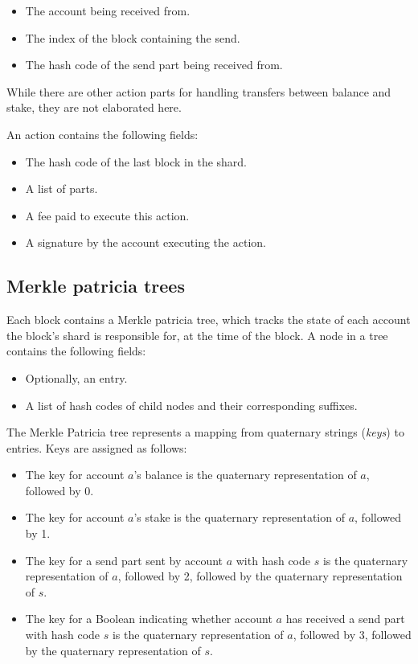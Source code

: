 \documentclass{article}
\begin{document}
\begin{itemize}
  \item The account being received from.
  \item The index of the block containing the send.
  \item The hash code of the send part being received from.
\end{itemize}

While there are other action parts for handling transfers between balance and stake, they are not elaborated here.

An action contains the following fields:

\begin{itemize}
  \item The hash code of the last block in the shard.
  \item A list of parts.
  \item A fee paid to execute this action.
  \item A signature by the account executing the action.
\end{itemize}

\subsection{Merkle patricia trees}

Each block contains a Merkle patricia tree, which tracks the state of each
account the block's shard is responsible for, at the time of the block.
A node in a tree contains the following fields:

\begin{itemize}
  \item Optionally, an entry.
  \item A list of hash codes of child nodes and their corresponding suffixes.
\end{itemize}

The Merkle Patricia tree represents a mapping from quaternary strings
(\textit{keys}) to entries.  Keys are assigned as follows:

\begin{itemize}
  \item The key for account $a$'s balance is the quaternary representation of $a$, followed by 0.
  \item The key for account $a$'s stake is the quaternary representation of $a$, followed by 1.
  \item The key for a send part sent by account $a$ with hash code $s$ is the quaternary representation of $a$, followed by 2, followed by the quaternary representation of $s$.
  \item The key for a Boolean indicating whether account $a$ has received a send part with hash code $s$ is the quaternary representation of $a$, followed by 3, followed by the quaternary representation of $s$.
\end{itemize}
\end{document}
